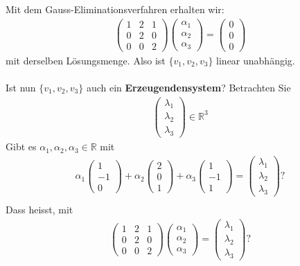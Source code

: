 \documentclass[11pt]{report}
\newcommand*\Zb[1] {\mathbb{#1}}
\newcommand*\f[1] {\textbf{#1}}
\begin{document}
Mit dem Gauss-Eliminationsverfahren erhalten wir:
\begin{align}
 \begin{pmatrix} 1  & 2 & 1 \\ 0 & 2 & 0 \\ 0 & 0 & 2 \end{pmatrix} \begin{pmatrix} \alpha_1 \\ \alpha_2 \\ \alpha_3 \end{pmatrix} = \begin{pmatrix} 0 \\ 0 \\ 0 \end{pmatrix}
\end{align}
mit derselben Lösungsmenge. Also ist $\{v_1, v_2, v_3\}$ linear unabhängig. \\\\
Ist nun $\{v_1, v_2, v_3\}$ auch ein \f{Erzeugendensystem}? Betrachten Sie
\begin{align}
 \begin{pmatrix} \lambda_1 \\ \lambda_2 \\ \lambda_3 \end{pmatrix} \in \Zb{R}^3
\end{align}
Gibt es $\alpha_1, \alpha_2, \alpha_3 \in \Zb{R}$ mit
\begin{align}
  \alpha_1 \begin{pmatrix} 1 \\ -1 \\ 0 \end{pmatrix} + \alpha_2 \begin{pmatrix} 2 \\ 0 \\ 1 \end{pmatrix} + \alpha_3 \begin{pmatrix} 1 \\ -1 \\ 1 \end{pmatrix} = \begin{pmatrix} \lambda_1 \\ \lambda_2 \\ \lambda_3 \end{pmatrix} ?\\
\end{align}
Dass heisst, mit
\begin{align}
 \begin{pmatrix} 1  & 2 & 1 \\ 0 & 2 & 0 \\ 0 & 0 & 2 \end{pmatrix} \begin{pmatrix} \alpha_1 \\ \alpha_2 \\ \alpha_3 \end{pmatrix} = \begin{pmatrix} \lambda_1 \\ \lambda_2 \\ \lambda_3 \end{pmatrix} ?
\end{align}
\end{document}
